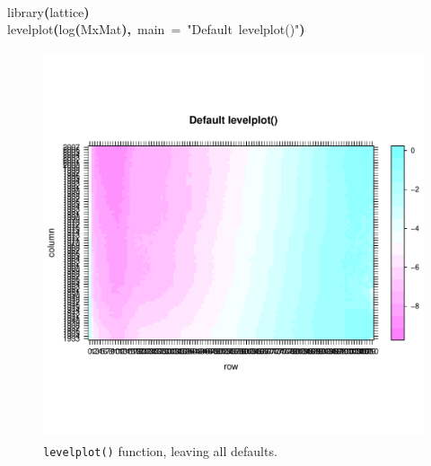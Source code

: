 \documentclass[a4paper]{article}
\newcommand{\hlfunctioncall}[1]{\textcolor[rgb]{1,0,0}{#1}}%
\newcommand{\hlstring}[1]{\textcolor[rgb]{0.6,0.6,1}{#1}}%
\newcommand{\hlkeyword}[1]{\textcolor[rgb]{0,0,0}{\textbf{#1}}}%
\newcommand{\hlargument}[1]{\textcolor[rgb]{0.694117647058824,0.247058823529412,0.0196078431372549}{#1}}%
\newcommand{\hlsymbol}[1]{\textcolor[rgb]{0,0,0}{#1}}%
\newcommand{\hlprompt}[1]{\textcolor[rgb]{0,0,0}{#1}}%
\newcommand{\hlstd}[1]{\textcolor[rgb]{0,0,0}{#1}}%
\newenvironment{Houtput}{\raggedright}{%
%
}
\begin{document}
\begin{Houtput}
\hspace*{\fill}\\
\hlstd{}\ttfamily\noindent
\hlprompt{\usebox{\hlnormalsizeboxgreaterthan}{\ }}\hlfunctioncall{library}\hlkeyword{(}\hlsymbol{lattice}\hlkeyword{)}\mbox{}
\normalfont
\hspace*{\fill}\\
\hlstd{}\ttfamily\noindent
\hlprompt{\usebox{\hlnormalsizeboxgreaterthan}{\ }}\hlfunctioncall{levelplot}\hlkeyword{(}\hlfunctioncall{log}\hlkeyword{(}\hlsymbol{MxMat}\hlkeyword{)}\hlkeyword{,}{\ }\hlargument{main}{\ }\hlargument{=}{\ }\hlstring{"Default{\ }levelplot()"}\hlkeyword{)}\mbox{}
\normalfont
\hspace*{\fill}\\
\hlstd{}
\end{Houtput}



\begin{figure}
\centering
\includegraphics[width=4.5in,height=4.5in]{figs/latticedefault.pdf}
\caption{\texttt{levelplot()} function, leaving all defaults.}
\end{figure}

\end{document}
